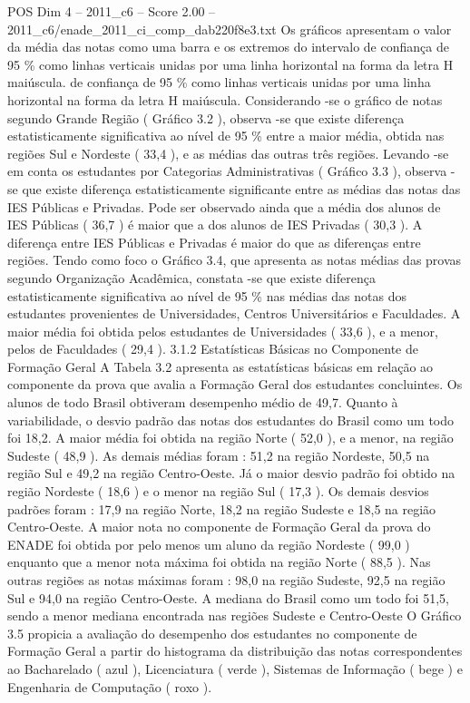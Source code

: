 \begin{textsample}{POS Dim 4 – 2011\_c6 – Score 2.00 – 2011\_c6/enade\_2011\_ci\_comp\_dab220f8e3.txt}
Os gráficos apresentam o valor da média das notas como uma barra e os extremos do intervalo de confiança de 95 \% como linhas verticais unidas por uma linha horizontal na forma da letra H maiúscula. de confiança de 95 \% como linhas verticais unidas por uma linha horizontal na forma da letra H maiúscula.
Considerando -se o gráfico de notas segundo Grande Região ( Gráfico 3.2 ), observa -se que existe diferença estatisticamente significativa ao nível de 95 \% entre a maior média, obtida nas regiões Sul e Nordeste ( 33,4 ), e as médias das outras três regiões.
Levando -se em conta os estudantes por Categorias Administrativas ( Gráfico 3.3 ), observa -se que existe diferença estatisticamente significante entre as médias das notas das IES Públicas e Privadas.
Pode ser observado ainda que a média dos alunos de IES Públicas ( 36,7 ) é maior que a dos alunos de IES Privadas ( 30,3 ).
A diferença entre IES Públicas e Privadas é maior do que as diferenças entre regiões.
Tendo como foco o Gráfico 3.4, que apresenta as notas médias das provas segundo Organização Acadêmica, constata -se que existe diferença estatisticamente significativa ao nível de 95 \% nas médias das notas dos estudantes provenientes de Universidades, Centros Universitários e Faculdades.
A maior média foi obtida pelos estudantes de Universidades ( 33,6 ), e a menor, pelos de Faculdades ( 29,4 ). 3.1.2 Estatísticas Básicas no Componente de Formação Geral A Tabela 3.2 apresenta as estatísticas básicas em relação ao componente da prova que avalia a Formação Geral dos estudantes concluintes.
Os alunos de todo Brasil obtiveram desempenho médio de 49,7.
Quanto à variabilidade, o desvio padrão das notas dos estudantes do Brasil como um todo foi 18,2.
A maior média foi obtida na região Norte ( 52,0 ), e a menor, na região Sudeste ( 48,9 ).
As demais médias foram : 51,2 na região Nordeste, 50,5 na região Sul e 49,2 na região Centro-Oeste.
Já o maior desvio padrão foi obtido na região Nordeste ( 18,6 ) e o menor na região Sul ( 17,3 ).
Os demais desvios padrões foram : 17,9 na região Norte, 18,2 na região Sudeste e 18,5 na região Centro-Oeste.
A maior nota no componente de Formação Geral da prova do ENADE foi obtida por pelo menos um aluno da região Nordeste ( 99,0 ) enquanto que a menor nota máxima foi obtida na região Norte ( 88,5 ).
Nas outras regiões as notas máximas foram : 98,0 na região Sudeste, 92,5 na região Sul e 94,0 na região Centro-Oeste.
A mediana do Brasil como um todo foi 51,5, sendo a menor mediana encontrada nas regiões Sudeste e Centro-Oeste O Gráfico 3.5 propicia a avaliação do desempenho dos estudantes no componente de Formação Geral a partir do histograma da distribuição das notas correspondentes ao Bacharelado ( azul ), Licenciatura ( verde ), Sistemas de Informação ( bege ) e Engenharia de Computação ( roxo ).

\end{textsample}
